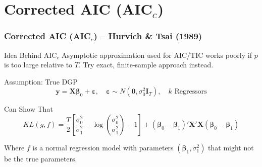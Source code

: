 \section{Corrected AIC (AIC$_c$)}
\begin{frame}
  \frametitle{Corrected AIC (AIC$_c$) -- Hurvich \& Tsai (1989)}

  \begin{block}{Idea Behind AIC$_c$}
    Asymptotic approximation used for AIC/TIC works poorly if $p$ is too large relative to $T$. \alert{Try exact, finite-sample approach instead.} 
  \end{block}

  \pause

  \begin{block}{Assumption: True DGP}
    \vspace{-1.5em}
    \[
      \mathbf{y} = \mathbf{X}\boldsymbol{\beta}_0 + \boldsymbol{\varepsilon}, \quad \boldsymbol{\varepsilon} \sim N(\mathbf{0}, \sigma_0^2 \mathbf{I}_T), \quad k \text{ Regressors}
    \]

    \pause

    \begin{block}{Can Show That}
      \vspace{-1em}
      \[
        KL(g,f) = \frac{T}{2}\left[ \frac{\sigma_0^2}{\sigma_1^2} - \log \left( \frac{\sigma_0^2}{\sigma_1^2} \right) - 1\right] + (\boldsymbol{\beta}_0 - \boldsymbol{\beta}_1)' \mathbf{X}'\mathbf{X} (\boldsymbol{\beta}_0 - \boldsymbol{\beta}_1)
      \]

      \vspace{1em}
    
      Where $f$ is a normal regression model with parameters $(\boldsymbol{\beta}_1, \sigma_1^2)$ that \alert{might not be the true parameters.} 
    \end{block}
    
  \end{block}
\end{frame}
